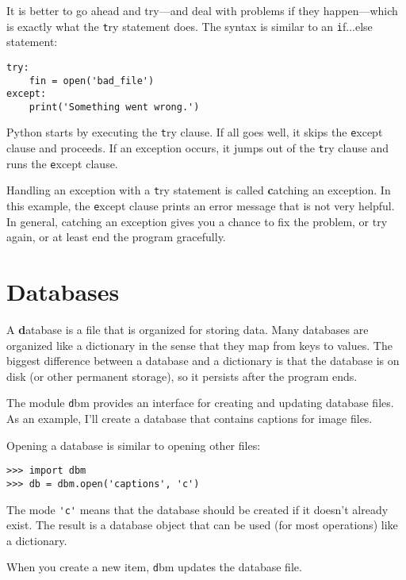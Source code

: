 \documentclass[
DIV=11,
fontsize=12,
twoside,
headinclude=false,
titlepage=firstiscover,
abstract=true,
headsepline=true,
footsepline=true,
chapterprefix=true, %
headings=big,
bibliography=totoc,%
captions=tableheading
]{scrbook}
\theoremstyle{definition}
\begin{document}
It is better to go ahead and try---and deal with problems if they
happen---which is exactly what the {\texttt try} statement does.  The
syntax is similar to an {\texttt if...else} statement:

\begin{lstlisting}
try:    
    fin = open('bad_file')
except:
    print('Something went wrong.')
\end{lstlisting}
%
Python starts by executing the {\texttt try} clause.  If all goes
well, it skips the {\texttt except} clause and proceeds.  If an
exception occurs, it jumps out of the {\texttt try} clause and
runs the {\texttt except} clause.

Handling an exception with a {\texttt try} statement is called {\textbf
catching} an exception.  In this example, the {\texttt except} clause
prints an error message that is not very helpful.  In general,
catching an exception gives you a chance to fix the problem, or try
again, or at least end the program gracefully.


\section{Databases}

A {\textbf database} is a file that is organized for storing data.  Many
databases are organized like a dictionary in the sense that they map
from keys to values.  The biggest difference between a database and a
dictionary is that the database is on disk (or other permanent
storage), so it persists after the program ends.   

The module {\texttt dbm} provides an interface for creating
and updating database files.
As an example, I'll create a database
that contains captions for image files.

Opening a database is similar to opening other files:

\begin{lstlisting}
>>> import dbm
>>> db = dbm.open('captions', 'c')
\end{lstlisting}
%
The mode \verb"'c'" means that the database should be created if
it doesn't already exist.  The result is a database object
that can be used (for most operations) like a dictionary.

When you create a new item, {\texttt dbm} updates the database file.
\end{document}
